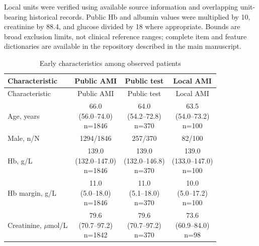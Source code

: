 \documentclass[pdflatex,sn-vancouver-num]{sn-jnl}
\begin{document}
\noindent Local units were verified using available source information and overlapping unit-bearing historical records. Public Hb and albumin values were multiplied by 10, creatinine by 88.4, and glucose divided by 18 where appropriate. Bounds are broad exclusion limits, not clinical reference ranges; complete item and feature dictionaries are available in the repository described in the main manuscript.\par\endgroup
\begingroup\scriptsize\setlength{\tabcolsep}{2pt}
\begin{longtable}{p{3.3cm}ccc}
\caption{Early characteristics among observed patients}\label{tab:s3}\\
\toprule
Characteristic & Public AMI & Public test & Local AMI\\\midrule
\endfirsthead
\toprule
Characteristic & Public AMI & Public test & Local AMI\\\midrule
\endhead
\endfoot
\bottomrule\endlastfoot
Age, years & \shortstack{66.0\\(56.0--74.0)\\n=1846} & \shortstack{64.0\\(54.2--72.8)\\n=370} & \shortstack{63.5\\(54.0--73.2)\\n=100}\\
Male, n/N & 1294/1846 & 257/370 & 82/100\\
Hb, g/L & \shortstack{139.0\\(132.0--147.0)\\n=1846} & \shortstack{139.0\\(132.0--146.8)\\n=370} & \shortstack{139.0\\(133.0--147.0)\\n=100}\\
Hb margin, g/L & \shortstack{11.0\\(5.0--18.0)\\n=1846} & \shortstack{11.0\\(5.1--18.0)\\n=370} & \shortstack{10.0\\(5.0--17.2)\\n=100}\\
Creatinine, $\mu$mol/L & \shortstack{79.6\\(70.7--97.2)\\n=1842} & \shortstack{79.6\\(70.7--97.2)\\n=370} & \shortstack{73.6\\(60.9--84.0)\\n=98}\\

\end{longtable}
\end{document}
